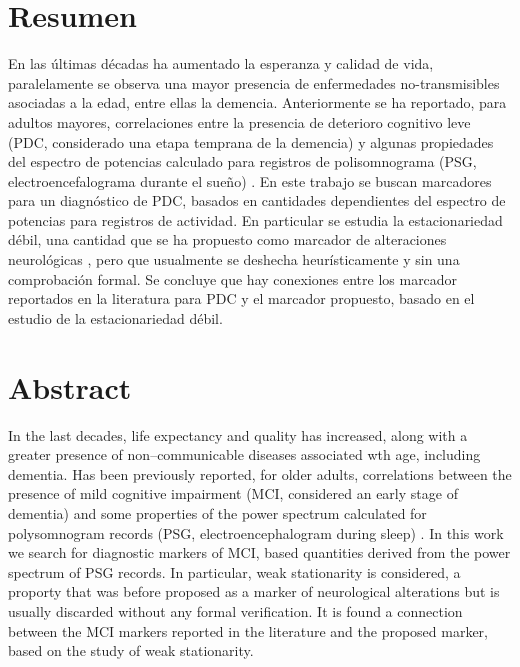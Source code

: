 \documentclass[12pt,letterpaper]{book}
\begin{document}
\setcounter{page}{1}

\chapter*{Resumen}

En las últimas décadas ha aumentado la esperanza y calidad de vida, paralelamente se observa una 
mayor presencia de enfermedades no-transmisibles asociadas a la edad, entre ellas la demencia.
%
Anteriormente se ha reportado, para adultos mayores, correlaciones entre la presencia de deterioro
cognitivo leve (PDC, considerado una etapa temprana de la demencia) y algunas propiedades del 
espectro  de potencias calculado para registros de polisomnograma (PSG, electroencefalograma 
durante el sueño) \cite{Brayet16}.
%
En este trabajo se buscan marcadores para un diagnóstico de PDC, basados en cantidades dependientes
del espectro de potencias para registros de actividad. En particular se estudia la estacionariedad 
débil, una cantidad que se ha propuesto como marcador de alteraciones neurológicas \cite{Cohen77}, 
pero que usualmente se deshecha heurísticamente y sin una comprobación formal.
%
Se concluye que hay conexiones entre los marcador reportados en la literatura para PDC y el 
marcador propuesto, basado en el estudio de la estacionariedad débil.

\newpage

\chapter*{Abstract}

In the last decades, life expectancy and quality has increased, along with a greater presence of
non--communicable diseases associated wth age, including dementia.
%
Has been previously reported, for older adults, correlations between the presence of mild cognitive 
impairment (MCI, considered an early stage of dementia) and some properties of the power spectrum
calculated for polysomnogram records (PSG, electroencephalogram during sleep) \cite{Brayet16}. 
%
In this work we search for diagnostic markers of MCI, based quantities derived from the power 
spectrum of PSG records.
%
In particular, weak stationarity is considered, a proporty that was before proposed as a marker of 
neurological alterations \cite{Cohen77} but is usually discarded without any formal verification. 
%
It is found a connection between the MCI markers reported in the literature and the proposed 
marker, based on the study of weak stationarity.
\end{document}
